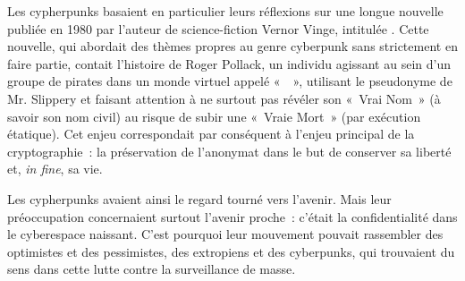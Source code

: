 Les cypherpunks basaient en particulier leurs réflexions sur une longue nouvelle publiée en 1980 par l'auteur de science-fiction Vernor Vinge, intitulée . Cette nouvelle, qui abordait des thèmes propres au genre cyberpunk sans strictement en faire partie, contait l'histoire de Roger Pollack, un individu agissant au sein d'un groupe de pirates dans un monde virtuel appelé «~~», utilisant le pseudonyme de Mr. Slippery et faisant attention à ne surtout pas révéler son «~Vrai Nom~» (à savoir son nom civil) au risque de subir une «~Vraie Mort~» (par exécution étatique). Cet enjeu correspondait par conséquent à l'enjeu principal de la cryptographie~: la préservation de l'anonymat dans le but de conserver sa liberté et, \emph{in fine}, sa vie. %

Les cypherpunks avaient ainsi le regard tourné vers l'avenir. Mais leur préoccupation concernaient surtout l'avenir proche~: c'était la confidentialité dans le cyberespace naissant. C'est pourquoi leur mouvement pouvait rassembler des optimistes et des pessimistes, des extropiens et des cyberpunks, qui trouvaient du sens dans cette lutte contre la surveillance de masse.

